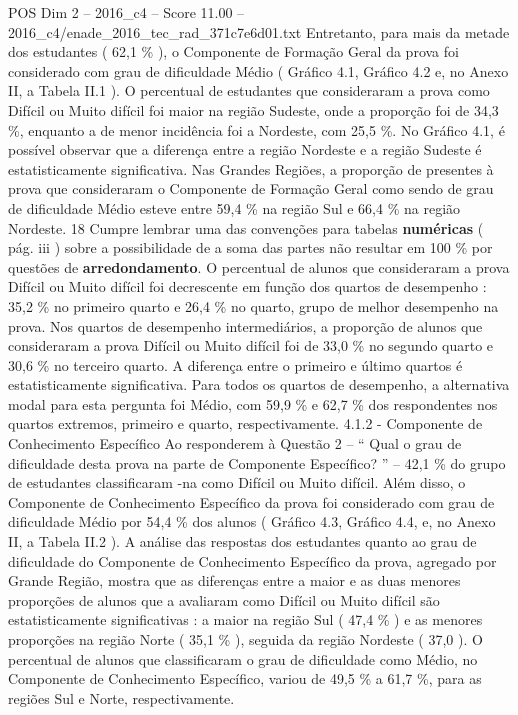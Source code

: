 \begin{textsample}{POS Dim 2 – 2016\_c4 – Score 11.00 – 2016\_c4/enade\_2016\_tec\_rad\_371c7e6d01.txt}
Entretanto, para mais da metade dos estudantes ( 62,1 \% ), o Componente de Formação Geral da prova foi considerado com grau de dificuldade Médio ( Gráfico 4.1, Gráfico 4.2 e, no Anexo II, a Tabela II.1 ).
O percentual de estudantes que consideraram a prova como Difícil ou Muito difícil foi maior na região Sudeste, onde a proporção foi de 34,3 \%, enquanto a de menor incidência foi a Nordeste, com 25,5 \%.
No Gráfico 4.1, é possível observar que a diferença entre a região Nordeste e a região Sudeste é estatisticamente significativa.
Nas Grandes Regiões, a proporção de presentes à prova que consideraram o Componente de Formação Geral como sendo de grau de dificuldade Médio esteve entre 59,4 \% na região Sul e 66,4 \% na região Nordeste. 18 Cumpre lembrar uma das convenções para tabelas \textbf{numéricas} ( pág. iii ) sobre a possibilidade de a soma das partes não resultar em 100 \% por questões de \textbf{arredondamento}.
O percentual de alunos que consideraram a prova Difícil ou Muito difícil foi decrescente em função dos quartos de desempenho : 35,2 \% no primeiro quarto e 26,4 \% no quarto, grupo de melhor desempenho na prova.
Nos quartos de desempenho intermediários, a proporção de alunos que consideraram a prova Difícil ou Muito difícil foi de 33,0 \% no segundo quarto e 30,6 \% no terceiro quarto.
A diferença entre o primeiro e último quartos é estatisticamente significativa.
Para todos os quartos de desempenho, a alternativa modal para esta pergunta foi Médio, com 59,9 \% e 62,7 \% dos respondentes nos quartos extremos, primeiro e quarto, respectivamente. 4.1.2 - Componente de Conhecimento Específico Ao responderem à Questão 2 – “ Qual o grau de dificuldade desta prova na parte de Componente Específico? ” – 42,1 \% do grupo de estudantes classificaram -na como Difícil ou Muito difícil.
Além disso, o Componente de Conhecimento Específico da prova foi considerado com grau de dificuldade Médio por 54,4 \% dos alunos ( Gráfico 4.3, Gráfico 4.4, e, no Anexo II, a Tabela II.2 ).
A análise das respostas dos estudantes quanto ao grau de dificuldade do Componente de Conhecimento Específico da prova, agregado por Grande Região, mostra que as diferenças entre a maior e as duas menores proporções de alunos que a avaliaram como Difícil ou Muito difícil são estatisticamente significativas : a maior na região Sul ( 47,4 \% ) e as menores proporções na região Norte ( 35,1 \% ), seguida da região Nordeste ( 37,0 ).
O percentual de alunos que classificaram o grau de dificuldade como Médio, no Componente de Conhecimento Específico, variou de 49,5 \% a 61,7 \%, para as regiões Sul e Norte, respectivamente.

\end{textsample}
